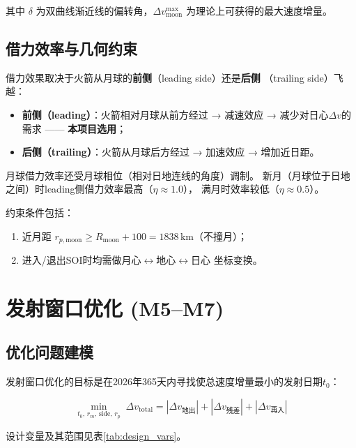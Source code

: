 \documentclass[UTF8,12pt,a4paper]{ctexart}
\begin{document}
其中 $\delta$ 为双曲线渐近线的偏转角，$\Delta v_{\text{moon}}^{\max}$
为理论上可获得的最大速度增量。

\subsection{借力效率与几何约束}

借力效果取决于火箭从月球的\textbf{前侧}（leading side）还是\textbf{后侧}
（trailing side）飞越：
\begin{itemize}
    \item \textbf{前侧（leading）}：火箭相对月球从前方经过 → 减速效应
          → 减少对日心$\Delta v$的需求 —— \textbf{本项目选用}；
    \item \textbf{后侧（trailing）}：火箭从月球后方经过 → 加速效应
          → 增加近日距。
\end{itemize}

月球借力效率还受月球相位（相对日地连线的角度）调制。
新月（月球位于日地之间）时leading侧借力效率最高（$\eta \approx 1.0$），
满月时效率较低（$\eta \approx 0.5$）。

约束条件包括：
\begin{enumerate}[label=\textbf{C\arabic*.}]
    \item 近月距 $r_{p,\text{moon}} \ge R_{\text{moon}} + 100 = 1838$\,km（不撞月）；
    \item 进入/退出SOI时均需做月心$\leftrightarrow$地心$\leftrightarrow$日心
          坐标变换。
\end{enumerate}

\section{发射窗口优化 (M5--M7)}

\subsection{优化问题建模}

发射窗口优化的目标是在2026年365天内寻找使总速度增量最小的发射日期$t_0$：

\begin{equation}\label{eq:objective_ext}
    \min_{t_0,\,r_m,\,\text{side},\,r_p}\;
    \Delta v_{\text{total}} = |\Delta v_{\text{地出}}| +
    |\Delta v_{\text{残差}}| + |\Delta v_{\text{再入}}|
\end{equation}

设计变量及其范围见表\ref{tab:design_vars}。
\end{document}
